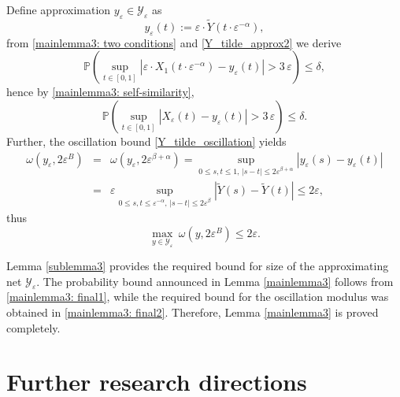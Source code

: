 \documentclass[12pt]{article}
\let\de\delta
\let\ep\varepsilon
\newcommand{\prob}{\mathbb{P}}
\newcommand\YY{\mathcal Y}
\let\le\leqslant
\theoremstyle{definition}
\begin{document}
Define approximation  $y_\ep\in \YY_\ep$ as
\[
    y_\ep(t):= \ep \cdot  \tilde Y(t\cdot \ep^{-\alpha}),
\]
from \eqref{mainlemma3: two conditions} and \eqref{Y_tilde_approx2} we derive
\begin{equation*}
    \prob \left( \sup_{t\in[0,1]}
      |\ep \cdot X_1(t\cdot \ep^{-\alpha}) - y_\ep(t)|
       > 3 \,\ep
           \right) 
    \le \de,
\end{equation*}
hence by \eqref{mainlemma3: self-similarity},
\begin{equation}\label{mainlemma3: final1}
    \prob \left(\sup_{t\in[0,1]} |X_\ep(t) - y_\ep(t)| > 3\, \ep \right) 
    \le \de.
\end{equation}
Further, the oscillation bound \eqref{Y_tilde_oscillation} yields
\begin{eqnarray*} %
     \omega(y_\ep,2\ep^{B}) &=&  \omega(y_\ep,2\ep^{\beta+\alpha}) 
     =  \sup_{0\le s,t\le 1, \, |s-t|\le 2\ep^{\beta+\alpha}} |y_\ep(s)-y_\ep(t)|
\\    %
        &=& \ep \sup_{0\le s,t\le \ep^{-\alpha}, \, |s-t|\le 2\ep^\beta } |\tilde Y(s)-\tilde Y(t)|
        \le 2\ep,
\end{eqnarray*}
thus
\begin{equation}  \label{mainlemma3: final2} 
     \max_{y \in \YY_\ep } \   \omega(y,2\ep^{B}) \le   2\ep.
\end{equation}

       
Lemma \ref{sublemma3} provides the required bound for size of the approximating net $\YY_\ep$.
The probability bound announced in Lemma \ref{mainlemma3} follows from \eqref{mainlemma3: final1},
while the required bound for the oscillation modulus was obtained in \eqref{mainlemma3: final2}.
Therefore, Lemma \ref{mainlemma3} is proved completely.


\section{Further research directions}
\end{document}
